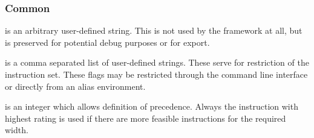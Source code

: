 \subsubsection{Common}
\begin{description}
  \item{} is an arbitrary user-defined string. This is not used by the framework at all, but is preserved for potential debug purposes or for export.
  \item{} is a comma separated list of user-defined strings. These serve for restriction of the instruction set. These flags may be restricted through the command line interface or directly from an alias environment.
  \item{} is an integer which allows definition of precedence. Always the instruction with highest rating is used if there are more feasible instructions for the required width.
\end{description}

